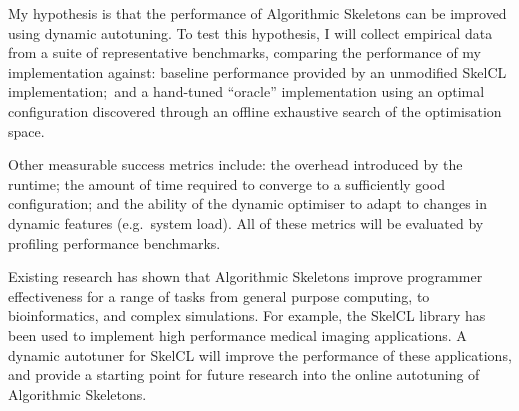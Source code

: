 My hypothesis is that the performance of Algorithmic Skeletons can be
improved using dynamic autotuning. To test this hypothesis, I will
collect empirical data from a suite of representative benchmarks,
comparing the performance of my implementation against: baseline
performance provided by an unmodified SkelCL implementation;\ and a
hand-tuned ``oracle'' implementation using an optimal configuration
discovered through an offline exhaustive search of the optimisation
space.

Other measurable success metrics include: the overhead introduced by
the runtime; the amount of time required to converge to a sufficiently
good configuration; and the ability of the dynamic optimiser to adapt
to changes in dynamic features (e.g.\ system load). All of these
metrics will be evaluated by profiling performance benchmarks.

Existing research has shown that Algorithmic Skeletons improve
programmer effectiveness for a range of tasks from general purpose
computing, to bioinformatics, and complex simulations. For example,
the SkelCL library has been used to implement high performance medical
imaging applications. A dynamic autotuner for SkelCL will improve the
performance of these applications, and provide a starting point for
future research into the online autotuning of Algorithmic Skeletons.


